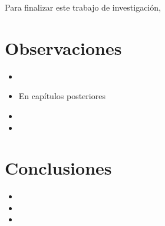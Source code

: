 Para finalizar este trabajo de investigación, \lipsum[2]
\section{Observaciones}
\begin{itemize}
    \item \lipsum[3]
    
    \item En capítulos posteriores \lipsum[4]
    
    \item \lipsum[10]
    
    \item \lipsum[11]
\end{itemize}

\section{Conclusiones}
\begin{itemize}
    \item \lipsum[12]

   \item \lipsum[13]
    
    \item \lipsum[14]
\end{itemize}
